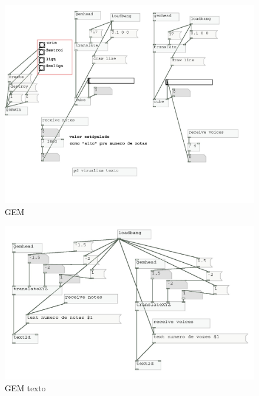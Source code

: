 \documentclass{ppgmus}
\begin{document}
\begin{figure}[-h]
\includegraphics[scale=.5]{gem00}
\caption{GEM}
\label{GEM}
\end{figure} 


\begin{figure}[-h]
\includegraphics[scale=.5]{gemtexto00}
\caption{GEM texto}
\label{GEM texto}
\end{figure} 
\end{document}
